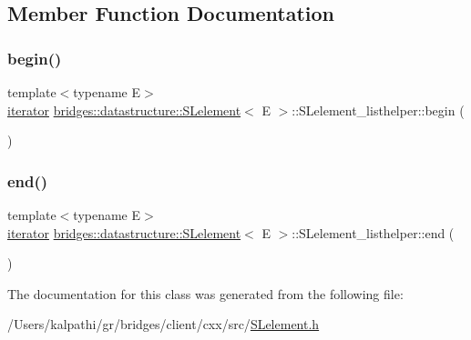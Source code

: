 \subsection{Member Function Documentation}
\mbox{\label{classbridges_1_1datastructure_1_1_s_lelement_1_1_s_lelement__listhelper_a9bc74da8d0ae6cfc9506ea9480c33a15}} 
\subsubsection{\texorpdfstring{begin()}{begin()}}
{\footnotesize\ttfamily template$<$typename E$>$ \\
\mbox{\hyperlink{classbridges_1_1datastructure_1_1_s_lelement_1_1_s_lelement__listhelper_1_1iterator}{iterator}} \mbox{\hyperlink{classbridges_1_1datastructure_1_1_s_lelement}{bridges\+::datastructure\+::\+S\+Lelement}}$<$ E $>$\+::S\+Lelement\+\_\+listhelper\+::begin (\begin{DoxyParamCaption}{ }\end{DoxyParamCaption})\hspace{0.3cm}{\ttfamily [inline]}}

\mbox{\label{classbridges_1_1datastructure_1_1_s_lelement_1_1_s_lelement__listhelper_aecbbc35682d82fa86a746b9a588525d0}} 
\subsubsection{\texorpdfstring{end()}{end()}}
{\footnotesize\ttfamily template$<$typename E$>$ \\
\mbox{\hyperlink{classbridges_1_1datastructure_1_1_s_lelement_1_1_s_lelement__listhelper_1_1iterator}{iterator}} \mbox{\hyperlink{classbridges_1_1datastructure_1_1_s_lelement}{bridges\+::datastructure\+::\+S\+Lelement}}$<$ E $>$\+::S\+Lelement\+\_\+listhelper\+::end (\begin{DoxyParamCaption}{ }\end{DoxyParamCaption})\hspace{0.3cm}{\ttfamily [inline]}}



The documentation for this class was generated from the following file\+:\begin{DoxyCompactItemize}
\item 
/\+Users/kalpathi/gr/bridges/client/cxx/src/\mbox{\hyperlink{_s_lelement_8h}{S\+Lelement.\+h}}\end{DoxyCompactItemize}
